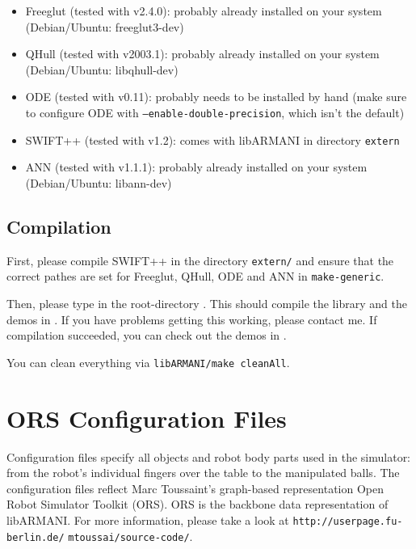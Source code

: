 \documentclass[10pt,twoside,twocolumn,fleqn]{article}
\begin{document}
\begin{itemize}
  \item Freeglut (tested with v2.4.0): probably already installed on your
system (Debian/Ubuntu: freeglut3-dev)
  \item QHull (tested with v2003.1): probably already installed on your system
(Debian/Ubuntu: libqhull-dev)
  \item ODE (tested with v0.11): probably needs to be installed by hand (make
sure to configure ODE with \texttt{--enable-double-precision}, which isn't
the default)
  \item SWIFT++ (tested with v1.2): comes with libARMANI in directory
\texttt{extern}
  \item ANN (tested with v1.1.1): probably already installed on your system
(Debian/Ubuntu: libann-dev)
\end{itemize}




\subsection{Compilation}

First, please compile SWIFT++ in the directory \texttt{extern/}
and ensure that the correct pathes are set for Freeglut,
QHull, ODE and ANN in \texttt{make-generic}.

Then, please type  in the root-directory
. This should compile the library
 and the demos in . If you have
problems getting this working, please contact me. If compilation
succeeded, you can check out the demos in .

You can clean everything via \texttt{libARMANI/make cleanAll}.




\section{ORS Configuration Files}

Configuration files specify all objects and robot body parts used in the
simulator: from the robot's individual fingers over the table to the
manipulated balls. The configuration files reflect Marc Toussaint's
graph-based representation Open Robot Simulator Toolkit (ORS). ORS is
the backbone data representation of libARMANI. For more information,
please take a look at \texttt{http://userpage.fu-berlin.de/}
\texttt{mtoussai/source-code/}.
\end{document}
